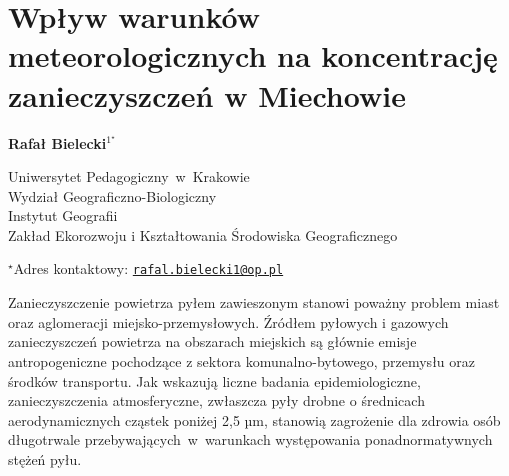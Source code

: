 \documentclass[\main/boa.tex]{subfiles}
\begin{document}
\sloppy
\section{Wpływ warunków meteorologicznych na koncentrację zanieczyszczeń w Miechowie}

\begin{center}
  {\bf {} Rafał Bielecki$^{1^\star}$}
\end{center}

\vskip 0.3cm

\begin{affiliations}
\begin{enumerate}
\begin{minipage}{0.915\textwidth}
\centering
\item Uniwersytet Pedagogiczny~w~Krakowie \\ Wydział Geograficzno-Biologiczny  \\ Instytut Geografii \\
Zakład Ekorozwoju i Kształtowania Środowiska Geograficznego \\[-2pt]
\end{minipage}
\end{enumerate}
$^\star$Adres kontaktowy: \href{mailto:rafal.bielecki1@op.pl}{\nolinkurl{rafal.bielecki1@op.pl}}\\
\end{affiliations}

\vskip 0.5cm


\vskip 0.5cm

Zanieczyszczenie powietrza pyłem zawieszonym stanowi poważny problem miast oraz aglomeracji miejsko-przemysłowych. Źródłem pyłowych i gazowych zanieczyszczeń powietrza na obszarach miejskich są głównie emisje antropogeniczne pochodzące z sektora komunalno-bytowego, przemysłu oraz środków transportu. Jak wskazują liczne badania epidemiologiczne, zanieczyszczenia atmosferyczne, zwłaszcza pyły drobne o średnicach aerodynamicznych cząstek poniżej 2,5 µm, stanowią zagrożenie dla zdrowia osób długotrwale przebywających~w~warunkach występowania ponadnormatywnych stężeń pyłu.
\end{document}
